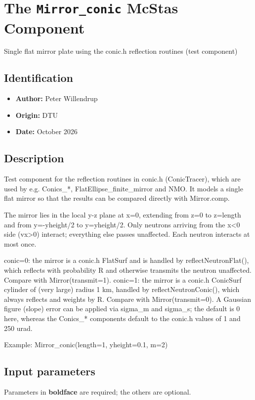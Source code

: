 \section{The \texttt{Mirror\_conic} McStas Component}
Single flat mirror plate using the conic.h reflection routines (test component)

\subsection*{Identification}
\begin{itemize}
  \item \textbf{Author:} Peter Willendrup
  \item \textbf{Origin:} DTU
  \item \textbf{Date:} October 2026
\end{itemize}

\subsection*{Description}
Test component for the reflection routines in conic.h (ConicTracer), which are used by e.g. Conics\_*, FlatEllipse\_finite\_mirror and NMO. It models a single flat mirror so that the results can be compared directly with Mirror.comp.

The mirror lies in the local y-z plane at x=0, extending from z=0 to z=length and from y=-yheight/2 to y=yheight/2. Only neutrons arriving from the x\textless{}0 side (vx\textgreater{}0) interact; everything else passes unaffected. Each neutron interacts at most once.

conic=0: the mirror is a conic.h FlatSurf and is handled by reflectNeutronFlat(), which reflects with probability R and otherwise transmits the neutron unaffected. Compare with Mirror(transmit=1). conic=1: the mirror is a conic.h ConicSurf cylinder of (very large) radius 1 km, handled by reflectNeutronConic(), which always reflects and weights by R. Compare with Mirror(transmit=0). A Gaussian figure (slope) error can be applied via sigma\_m and sigma\_s; the default is 0 here, whereas the Conics\_* components default to the conic.h values of 1 and 250 urad.

Example: Mirror\_conic(length=1, yheight=0.1, m=2)

\subsection*{Input parameters}
Parameters in \textbf{boldface} are required; the others are optional.

